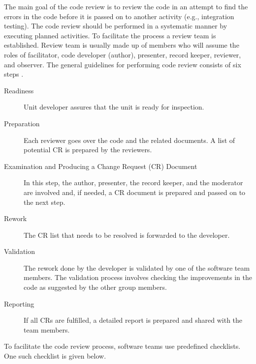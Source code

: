The main goal of the code review is to review the code in an attempt to find the errors in the code before it is passed on to another activity (e.g., integration testing). The code review should be performed in a systematic manner by executing planned activities. To facilitate the process a review team is established. Review team is usually made up of members who will assume the roles of facilitator, code developer (author), presenter, record keeper, reviewer, and observer.
The general guidelines for performing code review consists of six steps \autocite{naik2011software}.

\begin{description}
    \item[Readiness] Unit developer assures that the unit is ready for inspection. 
    \item[Preparation] Each reviewer goes over the code and the related documents. A list of potential CR is prepared by the reviewers.
    \item[Examination and Producing a Change Request (CR) Document] In this step, the author, presenter, the record keeper, and the moderator are involved and, if needed, a CR document is prepared and passed on to the next step.
    \item[Rework] The CR list that needs to be resolved is forwarded to the developer.
    \item[Validation] The rework done by the developer is validated by one of the software team members. The validation process involves checking the improvements in the code as suggested by the other group members. 
    \item[Reporting] If all CRs are fulfilled, a detailed report is prepared and shared with the team members.
\end{description}

To facilitate the code review process, software teams use predefined checklists. One such checklist is given below. 

